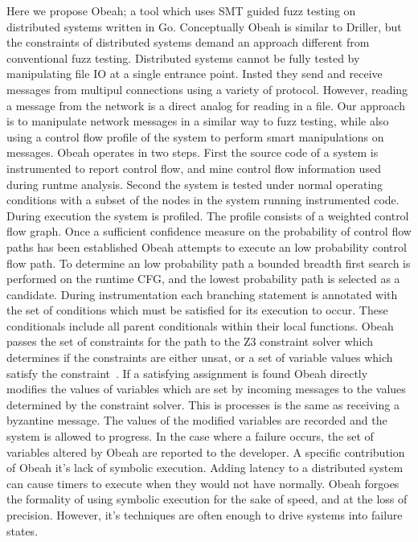 Here we propose Obeah; a tool which uses SMT guided fuzz testing on distributed
systems written in Go. Conceptually Obeah is similar to Driller, but the
constraints of distributed systems demand an approach different from
conventional fuzz testing. Distributed systems cannot be fully tested by
manipulating file IO at a single entrance point. Insted they send and receive
messages from multipul connections using a variety of protocol. However,
reading a message from the network is a direct analog for reading in a file.
Our approach is to manipulate network messages in a similar way to fuzz
testing, while also using a control flow profile of the system to perform smart
manipulations on messages.  Obeah operates in two steps. First the source code
of a system is instrumented to report control flow, and mine control flow
information used during runtme analysis.  Second the system is tested under
normal operating conditions with a subset of the nodes in the system running
instrumented code. During execution the system is profiled. The profile
consists of a weighted control flow graph. Once a sufficient confidence measure
on the probability of control flow paths has been established Obeah attempts to
execute an low probability control flow path. To determine an low probability
path a bounded breadth first search is performed on the runtime CFG, and the
lowest probability path is selected as a candidate. During instrumentation each
branching statement is annotated with the set of conditions which must be
satisfied for its execution to occur. These conditionals include all parent
conditionals within their local functions.  Obeah passes the set of constraints
for the path to the Z3 constraint solver which determines if the constraints
are either unsat, or a set of variable values which satisfy the
constraint~\cite{deMoura2008}. If a satisfying assignment is found Obeah
directly modifies the values of variables which are set by incoming messages to
the values determined by the constraint solver.  This is processes is the same
as receiving a byzantine message. The values of the modified variables are
recorded and the system is allowed to progress. In the case where a failure
occurs, the set of variables altered by Obeah are reported to the developer. A
specific contribution of Obeah it's lack of symbolic execution. Adding latency
to a distributed system can cause timers to execute when they would not have
normally. Obeah forgoes the formality of using symbolic execution for the sake
of speed, and at the loss of precision.  However, it's techniques are often
enough to drive systems into failure states.

